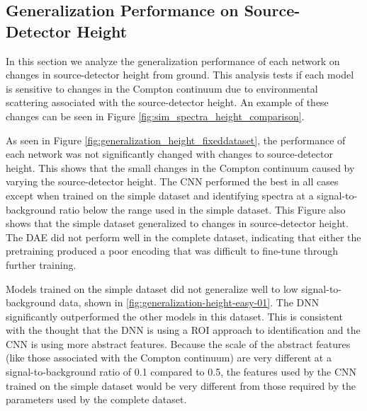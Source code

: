 


\newcommand{\blackline}{\raisebox{2pt}{\tikz{\draw[-,black!40!black,solid,line width = 1.1pt](0,0) -- (6mm,0);}}}

\newcommand{\blackdotline}{\raisebox{2pt}{\tikz{\draw[-,black!40!black,dashed,line width = 1.1pt](0,0) -- (6mm,0);}}}

\newcommand{\blackdashdotline}{\raisebox{2pt}{\tikz{\draw[-,black!40!black,dash dot,line width = 1.1pt](0,0) -- (6mm,0);}}}

\newcommand{\blackdottedline}{\raisebox{2pt}{\tikz{\draw[-,black!40!black,dotted,line width = 1.1pt](0,0) -- (6mm,0);}}}

\subsection{Generalization Performance on Source-Detector Height}

In this section we analyze the generalization performance of each network on changes in source-detector height from ground. This analysis tests if each model is sensitive to changes in the Compton continuum due to environmental scattering associated with the source-detector height. An example of these changes can be seen in Figure \ref{fig:sim_spectra_height_comparison}.

As seen in Figure \ref{fig:generalization_height_fixeddataset}, the performance of each network was not significantly changed with changes to source-detector height. This shows that the small changes in the Compton continuum caused by varying the source-detector height. The CNN performed the best in all cases except when trained on the simple dataset and identifying spectra at a signal-to-background ratio below the range used in the simple dataset. This Figure also shows that the simple dataset generalized to changes in source-detector height. The DAE did not perform well in the complete dataset, indicating that either the pretraining produced a poor encoding that was difficult to fine-tune through further training.

Models trained on the simple dataset did not generalize well to low signal-to-background data, shown in \ref{fig:generalization-height-easy-01}. The DNN significantly outperformed the other models in this dataset. This is consistent with the thought that the DNN is using a ROI approach to identification and the CNN is using more abstract features. Because the scale of the abstract features (like those associated with the Compton continuum) are very different at a signal-to-background ratio of 0.1 compared to 0.5, the features used by the CNN trained on the simple dataset would be very different from those required by the parameters used by the complete dataset.


